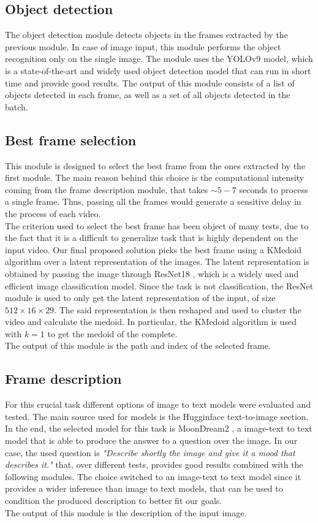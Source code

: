 \documentclass[conference]{IEEEtran}
\begin{document}
\subsection{Object detection}
The object detection module detects objects in the frames extracted by the previous module. In case of image input, this module performs the object recognition only on the single image. 
The module uses the YOLOv9 \cite{yolo} model, which is a state-of-the-art and widely used object detection model that can run in short time and provide good results.
The output of this module consists of a list of objects detected in each frame, as well as a set of all objects detected in the batch.

\subsection{Best frame selection}
This module is designed to select the best frame from the ones extracted by the first module. The main reason behind this choice is the computational intensity coming from the frame description module,
that takes $\sim 5-7$ seconds to process a single frame. Thus, passing all the frames would generate a sensitive delay in the process of each video. \\ 
The criterion used to select the best frame has been object of many tests, due to the fact that it is a difficult to generalize task that is highly dependent on the input video. 
Our final proposed solution picks the best frame using a KMedoid algorithm over a latent representation of the images. The latent representation is obtained by passing the image through ResNet18 \cite{resnet}, which is a widely used and efficient image classification model. Since the task is not classification, the ResNet module is used to only get the latent representation of the input, of size $512 \times 16 \times 29 $. The said representation is then reshaped and used to cluster the video and calculate the medoid. In particular, the KMedoid algorithm is used with $k=1$ to get the medoid of the complete. \\
The output of this module is the path and index of the selected frame.  

\subsection{Frame description}
For this crucial task different options of image to text models were evaluated and tested. The main source used for models is the Hugginface text-to-image section\cite{hfaceItt}.  
In the end, the selected model for this task is MoonDream2 \cite{moondream2}, a image-text to text model that is able to produce the answer to a question over the image.
In our case, the used question is \emph{"Describe shortly the image and give it a mood that describes it."} that, over different tests, provides good results combined with the following modules.
The choice switched to an image-text to text model since it provides a wider inference than image to text models, that can be used to condition the produced description to better fit our goals.\\
The output of this module is the description of the input image.
\end{document}
